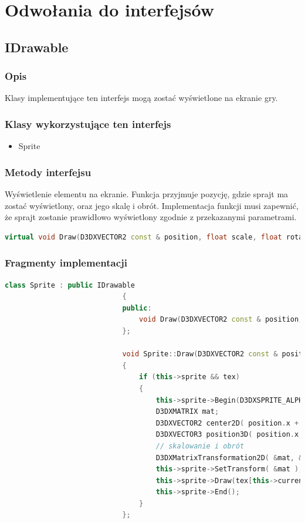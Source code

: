 \documentclass[a4paper,twoside]{article}
\begin{document}
			\section{Odwołania do interfejsów}
				\subsection{IDrawable}
					\subsubsection{Opis}
						Klasy implementujące ten interfejs mogą zostać wyświetlone na ekranie gry.
					\subsubsection{Klasy wykorzystujące ten interfejs}
						\begin{itemize}
							\item Sprite
						\end{itemize}
					\subsubsection{Metody interfejsu} Wyświetlenie elementu na ekranie. Funkcja przyjmuje pozycję, gdzie sprajt ma zostać wyświetlony, oraz jego skalę i obrót. Implementacja funkcji musi zapewnić, że sprajt zostanie prawidłowo wyświetlony zgodnie z przekazanymi parametrami.
							\begin{lstlisting}[language=C++]
								virtual void Draw(D3DXVECTOR2 const & position, float scale, float rotation) = 0;
							\end{lstlisting}
					\subsubsection{Fragmenty implementacji}
						\begin{lstlisting}[language=C++]
							class Sprite : public IDrawable
							{
							public:
								void Draw(D3DXVECTOR2 const & position, float scale = 1.0f, float rotation = 0.0f) override;
							};
							
							void Sprite::Draw(D3DXVECTOR2 const & position, float scale, float rotation)
							{
								if (this->sprite && tex)
								{
									this->sprite->Begin(D3DXSPRITE_ALPHABLEND);
									D3DXMATRIX mat;
									D3DXVECTOR2 center2D( position.x + center.x, position.y + center.y );
									D3DXVECTOR3 position3D( position.x, position.y, 0.0f );
									// skalowanie i obrót
									D3DXMatrixTransformation2D( &mat, &center2D, NULL, new D3DXVECTOR2( scale, scale ), &center2D, rotation, NULL );
									this->sprite->SetTransform( &mat );
									this->sprite->Draw(tex[this->currentTex], NULL, NULL, &position3D, this->color);
									this->sprite->End();
								}
							};
						\end{lstlisting}
				\newpage
\end{document}

